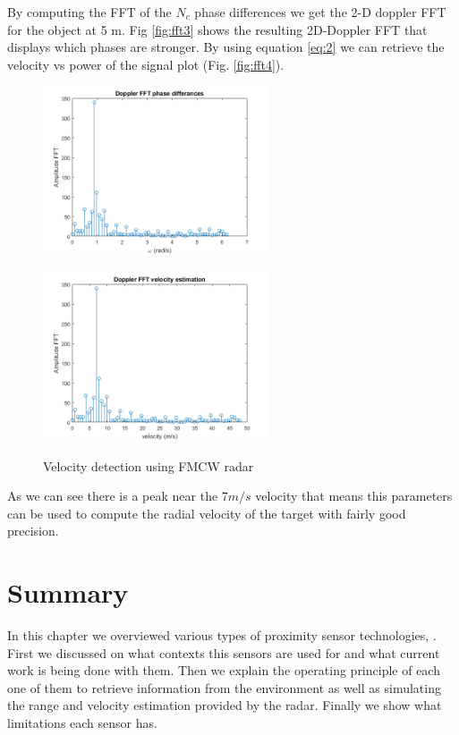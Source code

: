 By computing the FFT of the $N_c$ phase differences we get the 2-D doppler \ac{FFT}  for the object at 5 m.  Fig \ref{fig:fft3} shows the resulting  2D-Doppler FFT that displays which phases are stronger. By using equation \ref{eq:2} we can retrieve the velocity vs power of the signal plot (Fig. \ref{fig:fft4}). 
\begin{figure}[ht] 
    \begin{minipage}[b]{.49\linewidth}
        \includegraphics[height=5cm,width=\linewidth]{imgs/chapter2/fft3.png}
        \label{fig:fft3}
    \end{minipage}
    \begin{minipage}[b]{.49\linewidth}
        \includegraphics[height=5cm,width=\linewidth]{imgs/chapter2/fft4.png}
        \label{fig:fft4}
    \end{minipage}
    \caption{Velocity detection using \ac{FMCW} \ac{radar}}
    \label{fig:velocitydetermination}
\end{figure}
As we can see there is a peak near the $7 m/s$ velocity that means this parameters can be used to compute the radial velocity of the target with fairly good precision. 




\section{Summary}
In this chapter we overviewed various types of proximity sensor technologies, . First we discussed on what contexts this sensors are used for and what current work is being done with them. Then we explain the operating principle of each one of them to retrieve information from the environment as well as simulating the range and velocity estimation provided by the radar.  Finally we show what limitations each sensor has.





